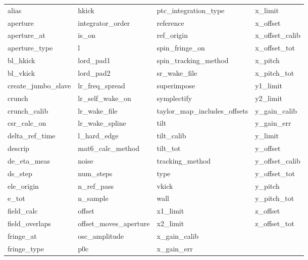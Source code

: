  \begin{tabular}{llll} \toprule
alias                       & hkick                       & ptc_integration_type        & x_limit                     \\
aperture                    & integrator_order            & reference                   & x_offset                    \\
aperture_at                 & is_on                       & ref_origin                  & x_offset_calib              \\
aperture_type               & l                           & spin_fringe_on              & x_offset_tot                \\
bl_hkick                    & lord_pad1                   & spin_tracking_method        & x_pitch                     \\
bl_vkick                    & lord_pad2                   & sr_wake_file                & x_pitch_tot                 \\
create_jumbo_slave          & lr_freq_spread              & superimpose                 & y1_limit                    \\
crunch                      & lr_self_wake_on             & symplectify                 & y2_limit                    \\
crunch_calib                & lr_wake_file                & taylor_map_includes_offsets & y_gain_calib                \\
csr_calc_on                 & lr_wake_spline              & tilt                        & y_gain_err                  \\
delta_ref_time              & l_hard_edge                 & tilt_calib                  & y_limit                     \\
descrip                     & mat6_calc_method            & tilt_tot                    & y_offset                    \\
de_eta_meas                 & noise                       & tracking_method             & y_offset_calib              \\
ds_step                     & num_steps                   & type                        & y_offset_tot                \\
ele_origin                  & n_ref_pass                  & vkick                       & y_pitch                     \\
e_tot                       & n_sample                    & wall                        & y_pitch_tot                 \\
field_calc                  & offset                      & x1_limit                    & z_offset                    \\
field_overlaps              & offset_moves_aperture       & x2_limit                    & z_offset_tot                \\
fringe_at                   & osc_amplitude               & x_gain_calib                &                             \\
fringe_type                 & p0c                         & x_gain_err                  &                             \\
 \bottomrule
 \end{tabular}
